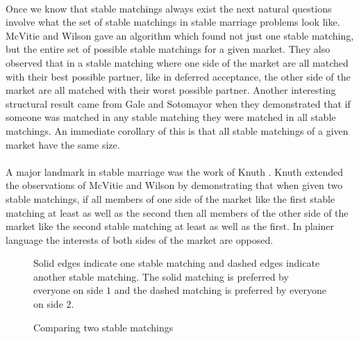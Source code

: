 \paragraph{}
Once we know that stable matchings always exist the next natural questions involve what the set of stable matchings in stable marriage problems look like. McVitie and Wilson \cite{mcvitie1971stable} gave an algorithm which found not just one stable matching, but the entire set of possible stable matchings for a given market. They also observed that in a stable matching where one side of the market are all matched with their best possible partner, like in deferred acceptance, the other side of the market are all matched with their worst possible partner. Another interesting structural result came from Gale and Sotomayor \cite{gale1985some} when they demonstrated that if someone was matched in any stable matching they were matched in all stable matchings. An immediate corollary of this is that all stable matchings of a given market have the same size. 
\paragraph{}
A major landmark in stable marriage was the work of Knuth \cite{knuthmariages}. Knuth extended the observations of McVitie and Wilson by demonstrating that when given two stable matchings, if all members of one side of the market like the first stable matching at least as well as the second then all members of the other side of the market like the second stable matching at least as well as the first. In plainer language the interests of both sides of the market are opposed.

\begin{figure}[h]
\centering
{}
\caption{Comparing two stable matchings}
\small
\begin{flushleft}
Solid edges indicate one stable matching and dashed edges indicate another stable matching. The solid matching is preferred by everyone on side $1$ and the dashed matching is preferred by everyone on side $2$.
\end{flushleft}
\end{figure}

